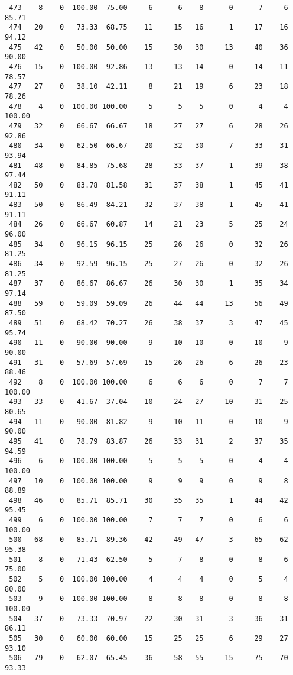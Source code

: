 \begin{verbatim}
 473    8    0  100.00  75.00     6      6    8      0      7     6    85.71
 474   20    0   73.33  68.75    11     15   16      1     17    16    94.12
 475   42    0   50.00  50.00    15     30   30     13     40    36    90.00
 476   15    0  100.00  92.86    13     13   14      0     14    11    78.57
 477   27    0   38.10  42.11     8     21   19      6     23    18    78.26
 478    4    0  100.00 100.00     5      5    5      0      4     4   100.00
 479   32    0   66.67  66.67    18     27   27      6     28    26    92.86
 480   34    0   62.50  66.67    20     32   30      7     33    31    93.94
 481   48    0   84.85  75.68    28     33   37      1     39    38    97.44
 482   50    0   83.78  81.58    31     37   38      1     45    41    91.11
 483   50    0   86.49  84.21    32     37   38      1     45    41    91.11
 484   26    0   66.67  60.87    14     21   23      5     25    24    96.00
 485   34    0   96.15  96.15    25     26   26      0     32    26    81.25
 486   34    0   92.59  96.15    25     27   26      0     32    26    81.25
 487   37    0   86.67  86.67    26     30   30      1     35    34    97.14
 488   59    0   59.09  59.09    26     44   44     13     56    49    87.50
 489   51    0   68.42  70.27    26     38   37      3     47    45    95.74
 490   11    0   90.00  90.00     9     10   10      0     10     9    90.00
 491   31    0   57.69  57.69    15     26   26      6     26    23    88.46
 492    8    0  100.00 100.00     6      6    6      0      7     7   100.00
 493   33    0   41.67  37.04    10     24   27     10     31    25    80.65
 494   11    0   90.00  81.82     9     10   11      0     10     9    90.00
 495   41    0   78.79  83.87    26     33   31      2     37    35    94.59
 496    6    0  100.00 100.00     5      5    5      0      4     4   100.00
 497   10    0  100.00 100.00     9      9    9      0      9     8    88.89
 498   46    0   85.71  85.71    30     35   35      1     44    42    95.45
 499    6    0  100.00 100.00     7      7    7      0      6     6   100.00
 500   68    0   85.71  89.36    42     49   47      3     65    62    95.38
 501    8    0   71.43  62.50     5      7    8      0      8     6    75.00
 502    5    0  100.00 100.00     4      4    4      0      5     4    80.00
 503    9    0  100.00 100.00     8      8    8      0      8     8   100.00
 504   37    0   73.33  70.97    22     30   31      3     36    31    86.11
 505   30    0   60.00  60.00    15     25   25      6     29    27    93.10
 506   79    0   62.07  65.45    36     58   55     15     75    70    93.33

\end{verbatim}
